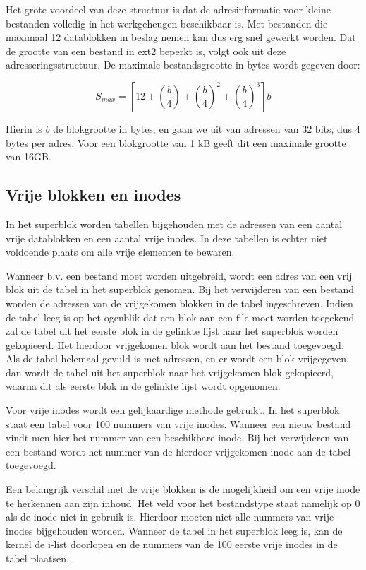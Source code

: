 Het grote voordeel van deze structuur is dat de adresinformatie voor kleine bestanden volledig in het werkgeheugen
beschikbaar is. Met bestanden die maximaal 12 datablokken in beslag nemen kan dus erg snel gewerkt worden. Dat de
grootte van een bestand in ext2 beperkt is, volgt ook uit deze adresseringsstructuur. De maximale bestandsgrootte
in bytes wordt gegeven door:

\begin{displaymath}
S_{max} = \left[12 + \left(\frac{b}{4}\right) + \left(\frac{b}{4}\right)^{2} + \left(\frac{b}{4}\right)^{3}\right]b
\end{displaymath}

Hierin is $b$ de blokgrootte in bytes, en gaan we uit van adressen van 32 bits, dus 4 bytes per adres. Voor een
blokgrootte van 1 kB geeft dit een maximale grootte van 16GB.

\subsection{Vrije blokken en inodes}

In het superblok worden tabellen bijgehouden met de adressen van een aantal vrije datablokken en een aantal vrije
inodes. In deze tabellen is echter niet voldoende plaats om alle vrije elementen te bewaren.

Wanneer b.v. een bestand moet worden uitgebreid, wordt een adres van een vrij blok uit de tabel in het superblok
genomen. Bij het verwijderen van een bestand worden de adressen van de vrijgekomen blokken in de tabel ingeschreven.
Indien de tabel leeg is op het ogenblik dat een blok aan een file moet worden toegekend zal de tabel uit het eerste
blok in de gelinkte lijst naar het superblok worden gekopieerd. Het hierdoor vrijgekomen blok wordt aan het bestand
toegevoegd. Als de tabel helemaal gevuld is met adressen, en er wordt een blok vrijgegeven, dan wordt de tabel uit
het superblok naar het vrijgekomen blok gekopieerd, waarna dit als eerste blok in de gelinkte lijst wordt opgenomen.

Voor vrije inodes wordt een gelijkaardige methode gebruikt. In het superblok staat een tabel voor 100 nummers van
vrije inodes.  Wanneer een nieuw bestand vindt men hier het nummer van een beschikbare inode. Bij het verwijderen
van een bestand wordt het nummer van de hierdoor vrijgekomen inode aan de tabel toegevoegd.

Een belangrijk verschil met de vrije blokken is de mogelijkheid om een vrije inode te herkennen aan zijn inhoud. Het
veld voor het bestandstype staat namelijk op 0 als de inode niet in gebruik is. Hierdoor moeten niet alle nummers van
vrije inodes bijgehouden worden. Wanneer de tabel in het superblok leeg is, kan de kernel de i-list doorlopen en de
nummers van de 100 eerste vrije inodes in de tabel plaatsen.

